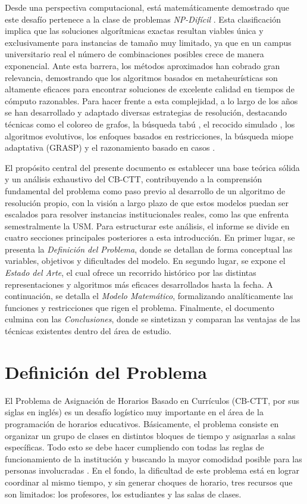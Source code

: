 \documentclass[letter, 10pt]{article}
\begin{document}
Desde una perspectiva computacional, está matemáticamente demostrado que este desafío pertenece a la clase de problemas \textit{NP-Difícil} \cite{schaerf1999}. Esta clasificación implica que las soluciones algorítmicas exactas resultan viables única y exclusivamente para instancias de tamaño muy limitado, ya que en un campus universitario real el número de combinaciones posibles crece de manera exponencial. Ante esta barrera, los métodos aproximados han cobrado gran relevancia, demostrando que los algoritmos basados en metaheurísticas son altamente eficaces para encontrar soluciones de excelente calidad en tiempos de cómputo razonables. Para hacer frente a esta complejidad, a lo largo de los años se han desarrollado y adaptado diversas estrategias de resolución, destacando técnicas como el coloreo de grafos, la búsqueda tabú \cite{lu2010}, el recocido simulado \cite{ceschia2012}, los algoritmos evolutivos, los enfoques basados en restricciones, la búsqueda miope adaptativa (GRASP) y el razonamiento basado en casos \cite{ceschia2023}.

El propósito central del presente documento es establecer una base teórica sólida y un análisis exhaustivo del CB-CTT, contribuyendo a la comprensión fundamental del problema como paso previo al desarrollo de un algoritmo de resolución propio, con la visión a largo plazo de que estos modelos puedan ser escalados para resolver instancias institucionales reales, como las que enfrenta semestralmente la USM. Para estructurar este análisis, el informe se divide en cuatro secciones principales posteriores a esta introducción. En primer lugar, se presenta la \textit{Definición del Problema}, donde se detallan de forma conceptual las variables, objetivos y dificultades del modelo. En segundo lugar, se expone el \textit{Estado del Arte}, el cual ofrece un recorrido histórico por las distintas representaciones y algoritmos más eficaces desarrollados hasta la fecha. A continuación, se detalla el \textit{Modelo Matemático}, formalizando analíticamente las funciones y restricciones que rigen el problema. Finalmente, el documento culmina con las \textit{Conclusiones}, donde se sintetizan y comparan las ventajas de las técnicas existentes dentro del área de estudio.

\section{Definici\'on del Problema}

El Problema de Asignación de Horarios Basado en Currículos (CB-CTT, por sus siglas en inglés) es un desafío logístico muy importante en el área de la programación de horarios educativos. Básicamente, el problema consiste en organizar un grupo de clases en distintos bloques de tiempo y asignarlas a salas específicas. Todo esto se debe hacer cumpliendo con todas las reglas de funcionamiento de la institución y buscando la mayor comodidad posible para las personas involucradas \cite{digaspero2007}. En el fondo, la dificultad de este problema está en lograr coordinar al mismo tiempo, y sin generar choques de horario, tres recursos que son limitados: los profesores, los estudiantes y las salas de clases.
\end{document}
